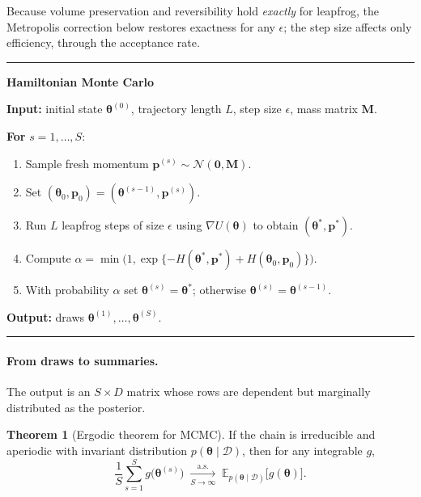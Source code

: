 \documentclass[10pt,a4paper]{article}
\theoremstyle{definition}
\newtheorem*{thm}{Theorem}
\newenvironment{algobox}[1]{%
  \par\vspace{3pt}\begin{center}\begin{minipage}{0.97\textwidth}%
  \rule{\linewidth}{0.8pt}\vspace{1pt}\par\textbf{#1}\par\vspace{1pt}\small
}{%
  \par\vspace{1pt}\rule{\linewidth}{0.8pt}\end{minipage}\end{center}\vspace{3pt}\par
}
\begin{document}
Because volume preservation and reversibility hold \emph{exactly} for leapfrog,
the Metropolis correction below restores exactness for any $\epsilon$; the step
size affects only efficiency, through the acceptance rate.

\begin{algobox}{Hamiltonian Monte Carlo}
\textbf{Input:} initial state $\boldsymbol{\theta}^{(0)}$, trajectory length
$L$, step size $\epsilon$, mass matrix $\mathbf{M}$.

\smallskip
\textbf{For} $s = 1, \dots, S$:
\begin{enumerate}
  \item Sample fresh momentum
        $\mathbf{p}^{(s)} \sim \mathcal{N}(\mathbf{0}, \mathbf{M})$.
  \item Set $(\boldsymbol{\theta}_{0}, \mathbf{p}_{0})
        = (\boldsymbol{\theta}^{(s-1)}, \mathbf{p}^{(s)})$.
  \item Run $L$ leapfrog steps of size $\epsilon$ using
        $\nabla U(\boldsymbol{\theta})$ to obtain
        $(\boldsymbol{\theta}^{*}, \mathbf{p}^{*})$.
  \item Compute
        $\alpha = \min\!\big(1, \exp\{-H(\boldsymbol{\theta}^{*}, \mathbf{p}^{*})
        + H(\boldsymbol{\theta}_{0}, \mathbf{p}_{0})\}\big)$.
  \item With probability $\alpha$ set
        $\boldsymbol{\theta}^{(s)} = \boldsymbol{\theta}^{*}$;
        otherwise $\boldsymbol{\theta}^{(s)} = \boldsymbol{\theta}^{(s-1)}$.
\end{enumerate}
\textbf{Output:} draws $\boldsymbol{\theta}^{(1)}, \dots,
\boldsymbol{\theta}^{(S)}$.
\end{algobox}

\paragraph{From draws to summaries.} The output is an $S \times D$ matrix whose
rows are dependent but marginally distributed as the posterior.

\begin{thm}[Ergodic theorem for MCMC]
If the chain is irreducible and aperiodic with invariant distribution
$p(\boldsymbol{\theta} \mid \mathcal{D})$, then for any integrable $g$,
\[
  \frac{1}{S}\sum_{s=1}^{S} g\big(\boldsymbol{\theta}^{(s)}\big)
  \;\xrightarrow[S \to \infty]{\text{a.s.}}\;
  \mathbb{E}_{p(\boldsymbol{\theta} \mid \mathcal{D})}
    \big[g(\boldsymbol{\theta})\big].
\]
\end{thm}
\end{document}

